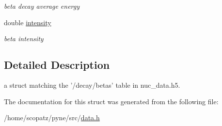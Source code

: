 \begin{DoxyCompactItemize}
\begin{DoxyCompactList}\small\item\em beta decay average energy \end{DoxyCompactList}\item 
\hypertarget{structpyne_1_1beta_a9c2cd5b0d491324940bdd68bde23113a}{double \hyperlink{structpyne_1_1beta_a9c2cd5b0d491324940bdd68bde23113a}{intensity}}\label{structpyne_1_1beta_a9c2cd5b0d491324940bdd68bde23113a}

\begin{DoxyCompactList}\small\item\em beta intensity \end{DoxyCompactList}\end{DoxyCompactItemize}


\subsection{Detailed Description}
a struct matching the '/decay/betas' table in nuc\-\_\-data.\-h5. 

The documentation for this struct was generated from the following file\-:\begin{DoxyCompactItemize}
\item 
/home/scopatz/pyne/src/\hyperlink{data_8h}{data.\-h}\end{DoxyCompactItemize}

